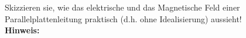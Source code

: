 \begin{question}[section=4,name={Feldbild},difficulty=,quantity=1,type=thr,tags={}]
	Skizzieren sie, wie das elektrische und das Magnetische Feld einer Parallelplattenleitung praktisch (d.h. ohne Idealisierung) aussieht! 
	\\ \textbf{Hinweis:}\\
	
\end{question}
\begin{solution}
	
\end{solution}